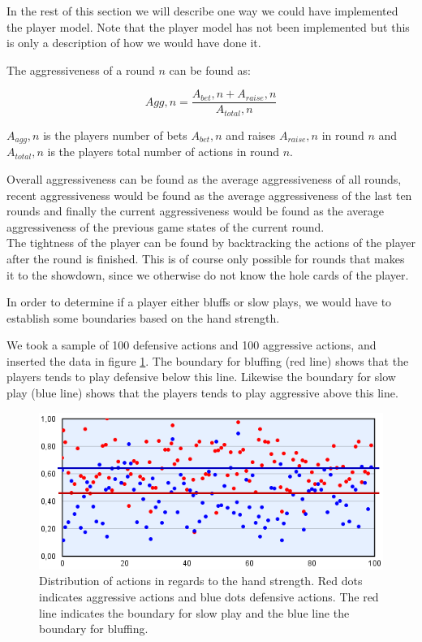 In the rest of this section we will describe one way we could have implemented the player model. Note that the player model has not been implemented but this is only a description of how we would have done it.

The aggressiveness of a round $n$ can be found as:

\[Agg,n = \frac{A_{bet},n + A_{raise},n}{A_{total},n}\]

$A_{agg},n$ is the players number of bets $A_{bet},n$ and raises $A_{raise},n$ in round $n$ and  $A_{total},n$ is the players total number of actions in round $n$. 

Overall aggressiveness can be found as the average aggressiveness of all rounds, recent aggressiveness would be found as the average aggressiveness of the last ten rounds and finally the current aggressiveness would be found as the average aggressiveness of the previous game states of the current round.\\

The tightness of the player can be found by backtracking the actions of the player after the round is finished. This is of course only possible for rounds that makes it to the showdown, since we otherwise do not know the hole cards of the player.

In order to determine if a player either bluffs or slow plays, we would have to establish some boundaries based on the hand strength. 

We took a sample of 100 defensive actions and 100 aggressive actions, and inserted the data in figure \ref{fig:dist-act}. The boundary for bluffing (red line) shows that the players tends to play defensive below this line. Likewise the boundary for slow play (blue line) shows that the players tends to play aggressive above this line.

\begin{figure}[H]
  \center
    \includegraphics[scale=0.775]{images/modeling/action-dist.png}
  \caption{Distribution of actions in regards to the hand strength. Red dots indicates aggressive actions and blue dots defensive actions. The red line indicates the boundary for slow play and the blue line the boundary for bluffing. \label{fig:dist-act}}
\end{figure}

